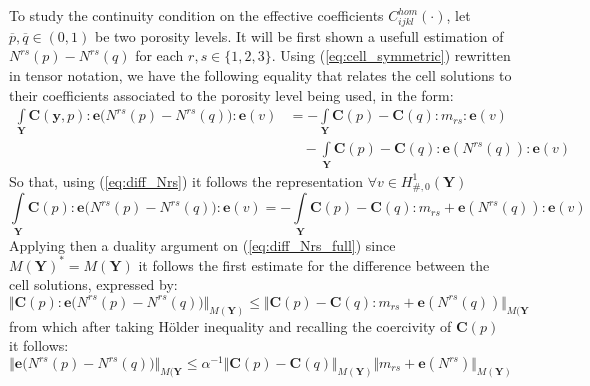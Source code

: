 To study the continuity condition on the effective coefficients $C^{hom}_{ijkl}(\cdot)$, let $\overline{p},\overline{q} \in (0,1)$ be two porosity levels. It will be first shown a usefull estimation of $N^{rs}(p)-N^{rs}(q)$ for each $r,s \in \{1,2,3\}$. 
Using (\ref{eq:cell_symmetric}) rewritten in tensor notation, we have the following equality that relates the cell solutions to their coefficients associated to the porosity level being used, in the form:
\begin{equation}
    \label{eq:diff_Nrs}
    \begin{aligned}
        \int\limits_{\mathbf{Y}} \mathbf{C}(\mathbf{y},p):\mathbf{e}\big( N^{rs}(p)-N^{rs}(q) \big) : \mathbf{e}(v) & =  -\int\limits_{\mathbf{Y}} \mathbf{C}(p)-\mathbf{C}(q) : m_{rs}:\mathbf{e}(v) \\
        & \quad - \int\limits_{\mathbf{Y}}\mathbf{C}(p)-\mathbf{C}(q):\mathbf{e}(N^{rs}(q)):\mathbf{e}(v)
    \end{aligned}
\end{equation}
So that, using (\ref{eq:diff_Nrs}) it follows the representation $\forall v \in H^1_{\#,0}(\mathbf{Y})$
\begin{equation}
    \label{eq:diff_Nrs_full}
    \int\limits_{\mathbf{Y}} \mathbf{C}(p):\mathbf{e}\big(N^{rs}(p)-N^{rs}(q)\big):\mathbf{e}(v) = -\int\limits_{\mathbf{Y}} \mathbf{C}(p)-\mathbf{C}(q):m_{rs}+\mathbf{e}(N^{rs}(q)):\mathbf{e}(v)
\end{equation}
Applying then a duality argument on (\ref{eq:diff_Nrs_full}) since $M(\mathbf{Y})^* = M(\mathbf{Y})$ it follows the first estimate for the difference between the cell solutions, expressed by:
\begin{equation*}
    \Vert \mathbf{C}(p):\mathbf{e}\big(N^{rs}(p)-N^{rs}(q)\big) \Vert_{M(\mathbf{Y})} \leq \Vert \mathbf{C}(p)-\mathbf{C}(q):m_{rs}+\mathbf{e}(N^{rs}(q))\Vert_{M(\mathbf{Y}}
\end{equation*}
from which after taking H\"{o}lder inequality and recalling the coercivity of $\mathbf{C}(p)$ it follows:
\begin{equation}
    \label{eq:ineq_diff_N}
    \Vert \mathbf{e}\big(N^{rs}(p)-N^{rs}(q)\big) \Vert_{M(\mathbf{Y}} \leq \alpha^{-1}\Vert \mathbf{C}(p)-\mathbf{C}(q) \Vert_{M(\mathbf{Y})} \Vert m_{rs}+\mathbf{e}(N^{rs}) \Vert_{M(\mathbf{Y})}
\end{equation}

